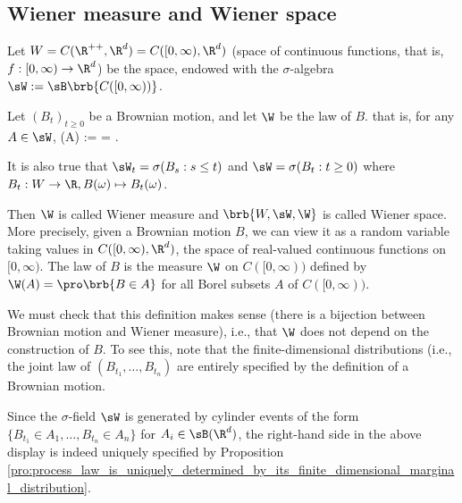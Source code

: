 \subsection{Wiener measure and Wiener space}


\begin{definition}\label{def:wiener_measure}
Let $W = C(\R^{++},\R^d) = C([0,\infty),\R^d)$ (space of continuous functions, that is, $f:[0,\infty) \to \R^d$) be the space, endowed with the $\sigma$-algebra $\sW :=\sB\brb{C([0,\infty))}$. %

Let $(B_t)_{t \geq 0}$ be a Brownian motion, and let $\W$ be the law of $B$. that is, for any $A \in \sW$,
\be
\W(A) := \pro{} = \pro{}.
\ee

It is also true that $\sW_t = \sigma(B_s: s \leq t)$ and $\sW = \sigma(B_t: t\geq 0)$ where $B_t: W\to\R, B(\omega) \mapsto B_t(\omega)$.

Then $\W$ is called Wiener measure and $\brb{W,\sW,\W}$ is called Wiener space.
More precisely, given a Brownian motion $B$, we can view it as a random variable taking values in $C([0,\infty),\R^d)$, the space of real-valued continuous functions on $[0,\infty)$. The law of $B$ is the measure $\W$ on $C([0,\infty))$ defined by $\W(A) = \pro\brb{B \in A}$ for all Borel subsets $A$ of $C([0,\infty))$.
\end{definition}

\begin{remark}
We must check that this definition makes sense (there is a bijection between Brownian motion and Wiener measure), i.e., that $\W$ does not depend on the construction of $B$. To see this, note that the finite-dimensional distributions (i.e., the joint law of $(B_{t_1} ,\dots,B_{t_n})$ are entirely specified by the definition of a Brownian motion.

Since the $\sigma$-field $\sW$ is generated by cylinder events of the form $\{B_{t_1} \in A_1,\dots,B_{t_n} \in A_n\}$ for $A_i \in \sB(\R^d)$, the right-hand side in the above display is indeed uniquely specified by Proposition \ref{pro:process_law_is_uniquely_determined_by_its_finite_dimensional_marginal_distribution}.
\end{remark}



